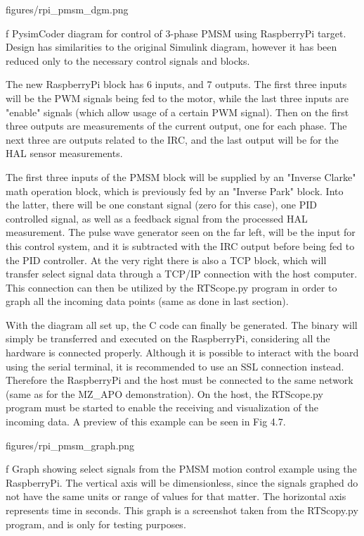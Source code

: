 \medskip {}
\picw=15cm \cinspic figures/rpi_pmsm_dgm.png
\caption/f PysimCoder diagram for control of 3-phase PMSM using RaspberryPi target. Design has
similarities to the original Simulink diagram, however it has been reduced only to the necessary
control signals and blocks.
\medskip

\quad The new RaspberryPi block has 6 inputs, and 7 outputs. The first three inputs will be the
PWM signals being fed to the motor, while the last three inputs are "enable" signals (which allow
usage of a certain PWM signal). Then on the first three outputs are measurements of the current
output, one for each phase. The next three are outputs related to the IRC, and the last output
will be for the HAL sensor measurements. 

\quad The first three inputs of the PMSM block will be supplied by an "Inverse Clarke" math
operation block, which is previously fed by an "Inverse Park" block. Into the latter, there will
be one constant signal (zero for this case), one PID controlled signal, as well as a feedback signal
from the processed HAL measurement. The pulse wave generator seen on the far left, will be the input
for this control system, and it is subtracted with the IRC output before being fed to the PID
controller. At the very right there is also a TCP block, which will transfer select signal data
through a TCP/IP connection with the host computer. This connection can then be utilized by the
RTScope.py program in order to graph all the incoming data points (same as done in last section).

\quad With the diagram all set up, the C code can finally be generated. The binary will simply
be transferred and executed on the RaspberryPi, considering all the hardware is connected properly.
Although it is possible to interact with the board using the serial terminal, it is recommended
to use an SSL connection instead. Therefore the RaspberryPi and the host must be connected to the
same network (same as for the MZ_APO demonstration). On the host, the RTScope.py program must be
started to enable the receiving and visualization of the incoming data. A preview of this example
can be seen in Fig 4.7. 

\medskip {}
\picw=15cm \cinspic figures/rpi_pmsm_graph.png
\caption/f Graph showing select signals from the PMSM motion control example using the RaspberryPi.
The vertical axis will be dimensionless, since the signals graphed do not have the same units or
range of values for that matter. The horizontal axis represents time in seconds. This graph is a
screenshot taken from the RTScopy.py program, and is only for testing purposes. 
\medskip

